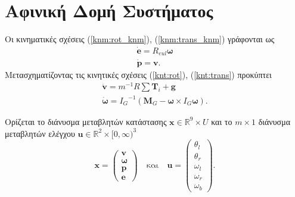 \section{Αφινική Δομή Συστήματος}

Οι κινηματικές σχέσεις (\ref{knm:rot_knm}), (\ref{knm:trans_knm}) γράφονται ως
\begin{gather}
    \mathbf{\dot e} = R_{eul}\bm{\omega}\\
    \mathbf{\dot p} = \mathbf{v}.
\end{gather}
Μετασχηματίζοντας τις κινητικές σχέσεις (\ref{knt:rot}), (\ref{knt:trans}) 
προκύπτει
\begin{gather}
    \mathbf{{\dot v}} = m^{-1}R \sum \mathbf{T}_i + \mathbf{g}\\
    \bm{{\dot \omega}} = {I_G}^{-1}\left(\mathbf{M}_G - \bm{\omega}\times I_G
    \bm{\omega}\right).
\end{gather}

Ορίζεται το διάνυσμα μεταβλητών κατάστασης $\mathbf{x} \in
    \mathbb{R}^{9}\!\times U$ και το $m\times1$ διάνυσμα μεταβλητών ελέγχου 
    $\mathbf{u} \in \mathbb{R}^{2}\times [0,\infty)^3$ 
\begin{equation*}
    \mathbf{x} =
    \begin{pmatrix}
        \mathbf{v} \\ \bm{\omega} \\ \mathbf{p} \\ \mathbf{e}
    \end{pmatrix}\quad \text{και} \quad
    \mathbf{u} =
    \begin{pmatrix}
        \theta_l \\ \theta_r \\ \omega_l \\ \omega_r \\ \omega_b
    \end{pmatrix}.
\end{equation*}

